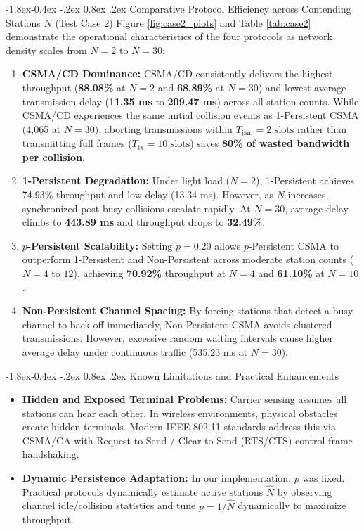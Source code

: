 \documentclass[11pt,a4paper]{article}
\makeatletter
\renewcommand\subsection{\@startsection{subsection}{2}{\z@}%
                                     {-1.8ex\@plus -0.4ex \@minus -.2ex}%
                                     {0.8ex \@plus .2ex}%
                                     {\normalfont\large\bfseries}}
\makeatother
\begin{document}
\subsection{Comparative Protocol Efficiency across Contending Stations \texorpdfstring{$N$}{N} (Test Case 2)}
Figure \ref{fig:case2_plots} and Table \ref{tab:case2} demonstrate the operational characteristics of the four protocols as network density scales from $N = 2$ to $N = 30$:
\begin{enumerate}
    \item \textbf{CSMA/CD Dominance:} CSMA/CD consistently delivers the highest throughput (\textbf{88.08\%} at $N=2$ and \textbf{68.89\%} at $N=30$) and lowest average transmission delay (\textbf{11.35 ms} to \textbf{209.47 ms}) across all station counts. While CSMA/CD experiences the same initial collision events as 1-Persistent CSMA (4,065 at $N=30$), aborting transmissions within $T_{\text{jam}} = 2\text{ slots}$ rather than transmitting full frames ($T_{\text{tx}} = 10\text{ slots}$) saves \textbf{80\% of wasted bandwidth per collision}.
    \item \textbf{1-Persistent Degradation:} Under light load ($N = 2$), 1-Persistent achieves 74.93\% throughput and low delay (13.34 ms). However, as $N$ increases, synchronized post-busy collisions escalate rapidly. At $N = 30$, average delay climbs to \textbf{443.89 ms} and throughput drops to \textbf{32.49\%}.
    \item \textbf{$p$-Persistent Scalability:} Setting $p = 0.20$ allows $p$-Persistent CSMA to outperform 1-Persistent and Non-Persistent across moderate station counts ($N = 4$ to $12$), achieving \textbf{70.92\%} throughput at $N = 4$ and \textbf{61.10\%} at $N = 10$.
    \item \textbf{Non-Persistent Channel Spacing:} By forcing stations that detect a busy channel to back off immediately, Non-Persistent CSMA avoids clustered transmissions. However, excessive random waiting intervals cause higher average delay under continuous traffic (535.23 ms at $N=30$).
\end{enumerate}

\subsection{Known Limitations and Practical Enhancements}
\begin{itemize}
    \item \textbf{Hidden and Exposed Terminal Problems:} Carrier sensing assumes all stations can hear each other. In wireless environments, physical obstacles create hidden terminals. Modern IEEE 802.11 standards address this via CSMA/CA with Request-to-Send / Clear-to-Send (RTS/CTS) control frame handshaking.
    \item \textbf{Dynamic Persistence Adaptation:} In our implementation, $p$ was fixed. Practical protocols dynamically estimate active stations $\hat{N}$ by observing channel idle/collision statistics and tune $p = 1/\hat{N}$ dynamically to maximize throughput.
\end{itemize}
\end{document}
